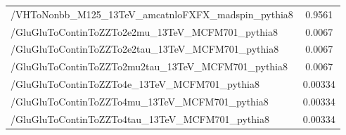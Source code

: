 \begin{table}[h]
\begin{center}
{\begin{tabular}{|l|c|}
/VHToNonbb\_M125\_13TeV\_amcatnloFXFX\_madspin\_pythia8                       & 0.9561 \\
/GluGluToContinToZZTo2e2mu\_13TeV\_MCFM701\_pythia8                           & 0.0067\\
/GluGluToContinToZZTo2e2tau\_13TeV\_MCFM701\_pythia8                          & 0.0067\\
/GluGluToContinToZZTo2mu2tau\_13TeV\_MCFM701\_pythia8                         & 0.0067\\
/GluGluToContinToZZTo4e\_13TeV\_MCFM701\_pythia8                              & 0.00334 \\
/GluGluToContinToZZTo4mu\_13TeV\_MCFM701\_pythia8                             & 0.00334 \\
/GluGluToContinToZZTo4tau\_13TeV\_MCFM701\_pythia8                            & 0.00334 \\
\hline
\end{tabular}}
\end{center}
\end{table}

